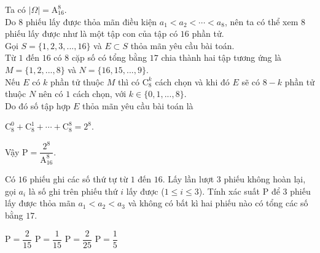 \begin{vd}
{\begin{tongquat}
\begin{itemize}
			\end{itemize}
		\end{tongquat}
		\noindent
		Ta có $|\Omega| = \mathrm{A}_{16}^8$.\\
		Do $8$ phiếu lấy được thỏa mãn điều kiện $a_1<a_2< \cdots < a_8$, nên ta có thể xem $8$ phiếu lấy được như là một tập con của tập có $16$ phần tử.\\
		Gọi $S=\{1,2,3,...,16\}$ và $E \subset S$ thỏa mãn yêu cầu bài toán. \\
		Từ $1$ đến $16$ có $8$ cặp số  có tổng bằng $17$ chia thành hai tập tương ứng là $M=\{1,2,...,8\}$ và $N=\{16,15,...,9\}$. \\
		Nếu $E$ có $k$ phần tử thuộc $M$ thì có $\mathrm{C}^k_{8}$ cách chọn và khi đó $E$ sẽ có  $8-k$ phần tử thuộc $N$ nên có $1$ cách chọn, với $k\in \{0,1,...,8\}$.  \\
		Do đó số tập hợp $E$ thỏa mãn yêu cầu bài toán là
		\begin{center}
			$\mathrm{C}^0_{8}+\mathrm{C}^1_{8}+\cdots +\mathrm{C}^{8}_{8}=2^{8}.$ 
		\end{center}
		Vậy $\mathrm{P} = \dfrac{2^{8}}{ \mathrm{A}_{16}^8}$.
	}
\end{vd}
\begin{bt}%
	Có $16$ phiếu ghi các số thứ tự từ $1$ đến $16$. Lấy lần lượt $3$ phiếu không hoàn lại, gọi $a_i$ là số ghi trên phiếu thứ $i$ lấy được ($1\le i \le 3$). Tính xác suất $\mathrm{P}$ để  $3$ phiếu lấy được thỏa mãn $a_1<a_2< a_3$ và không có bất kì hai phiếu nào có tổng các số bằng $17$.
	
	\choice
	{\True $\mathrm{P} = \dfrac{2}{ 15}$} 
	{ $\mathrm{P} = \dfrac{1}{ 15}$} 
	{ $\mathrm{P} = \dfrac{2}{ 25}$} 
	{ $\mathrm{P} = \dfrac{1}{ 5}$} 
\end{bt}

